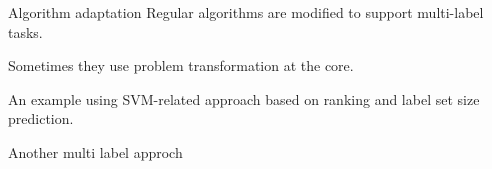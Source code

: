 \begin{frame}{Algorithm adaptation}
	Regular algorithms are modified to support multi-label tasks.
	
	Sometimes they use problem transformation at the core.
	
	An example using SVM-related approach based on ranking and label set size prediction.
\end{frame}

\begin{frame}{Another multi label approch}
	
	\begin{flushright}
		\cite{ml1}
	\end{flushright}
\end{frame}